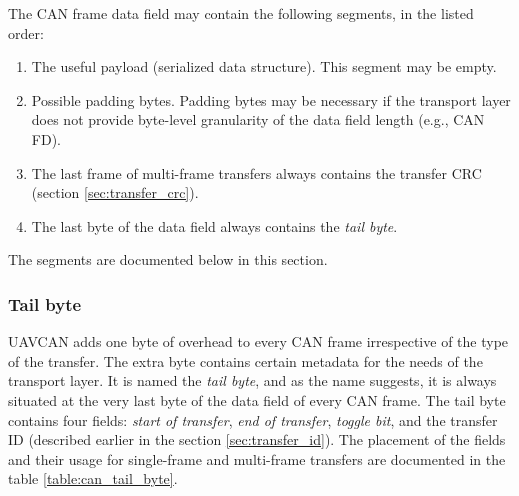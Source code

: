 The CAN frame data field may contain the following segments, in the listed order:
\begin{enumerate}
    \item The useful payload (serialized data structure). This segment may be empty.
    \item Possible padding bytes.
          Padding bytes may be necessary if the transport layer does not provide byte-level
          granularity of the data field length (e.g., CAN FD).
    \item The last frame of multi-frame transfers always contains the transfer CRC (section \ref{sec:transfer_crc}).
    \item The last byte of the data field always contains the \emph{tail byte}.
\end{enumerate}
The segments are documented below in this section.

\subsubsection{Tail byte}

UAVCAN adds one byte of overhead to every CAN frame irrespective of the type of the transfer.
The extra byte contains certain metadata for the needs of the transport layer.
It is named the \emph{tail byte}, and as the name suggests, it is always situated
at the very last byte of the data field of every CAN frame.
The tail byte contains four fields: \emph{start of transfer}, \emph{end of transfer},
\emph{toggle bit}, and the transfer ID (described earlier in the section \ref{sec:transfer_id}).
The placement of the fields and their usage for single-frame and multi-frame transfers
are documented in the table \ref{table:can_tail_byte}.

